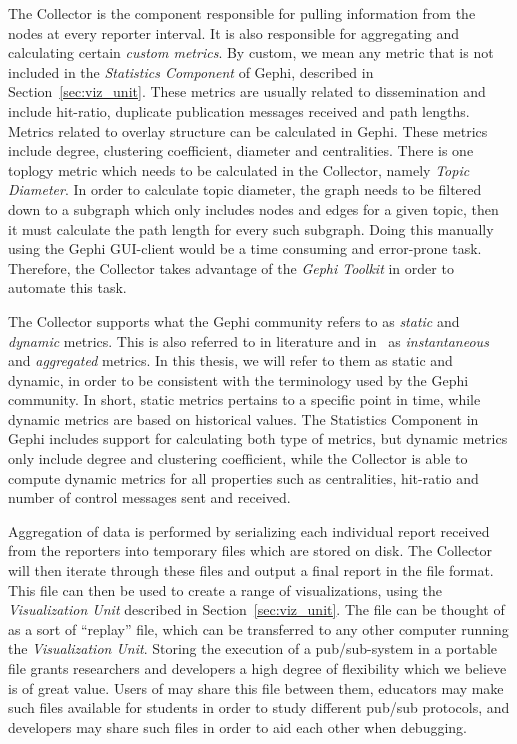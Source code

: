 The Collector is the component responsible for pulling information from
the nodes at every reporter interval. It is also responsible for
aggregating and calculating certain \emph{custom metrics}. By custom, we mean
any metric that is not included in the \emph{Statistics Component} of
Gephi, described in Section~\ref{sec:viz_unit}. These
metrics are usually related to dissemination and include hit-ratio,
duplicate publication messages received and path lengths. Metrics
related to overlay structure can be calculated in Gephi. These metrics
include degree, clustering coefficient, diameter and centralities. There
is one toplogy metric which needs to be calculated in the Collector,
namely \emph{Topic Diameter}. In order to calculate topic
diameter, the graph needs to be filtered down to a subgraph which only
includes nodes and edges for a given topic, then it must calculate the
path length for every such subgraph. Doing this manually using
the Gephi GUI-client would be a time consuming and error-prone task.
Therefore, the Collector takes advantage of the \emph{Gephi Toolkit} in order to
automate this task.

The Collector supports what the Gephi community
refers to as \emph{static} and \emph{dynamic} metrics. This is also
referred to in literature and in~\cite{korsveien2014vizpub} as
\emph{instantaneous} and \emph{aggregated} metrics. In this thesis, we
will refer to them as static and dynamic, in order to be consistent
with the terminology used by the Gephi community. In short, static
metrics pertains to a specific point in time, while dynamic metrics are
based on historical values. The Statistics Component in Gephi includes
support for calculating both type of metrics, but dynamic metrics only include degree and
clustering coefficient, while the Collector is able to compute dynamic
metrics for all properties such as centralities, hit-ratio and number of
control messages sent and received.

Aggregation of data is performed by serializing each individual report
received from the reporters into temporary files which are stored on
disk. The Collector will then iterate through these files and output a
final report in the \gexf{} file format. This file can then be used to
create a range of visualizations, using the \emph{Visualization Unit}
described in Section~\ref{sec:viz_unit}. The \gexf{} file can be thought
of as a sort of ``replay'' file, which can be transferred to any other
computer running the \emph{Visualization Unit}. Storing the execution
of a pub/sub-system in a portable file grants researchers and developers
a high degree of flexibility which we believe is of great value. Users
of \demo{} may share this file between them, educators may make such
files available for students in order to study different pub/sub
protocols, and developers may share such files in order to aid each
other when debugging.

